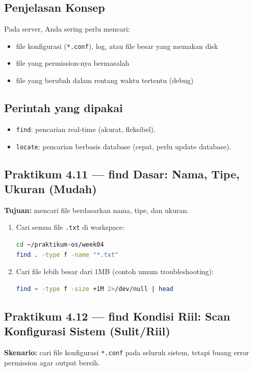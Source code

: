 \subsection*{Penjelasan Konsep}
Pada server, Anda sering perlu mencari:
\begin{itemize}
    \item file konfigurasi (\texttt{*.conf}), log, atau file besar yang memakan disk
    \item file yang permission-nya bermasalah
    \item file yang berubah dalam rentang waktu tertentu (debug)
\end{itemize}

\subsection*{Perintah yang dipakai}
\begin{itemize}
    \item \texttt{find}: pencarian real-time (akurat, fleksibel).
    \item \texttt{locate}: pencarian berbasis database (cepat, perlu update database).
\end{itemize}

\subsection*{Praktikum 4.11 --- find Dasar: Nama, Tipe, Ukuran (Mudah)}
\textbf{Tujuan:} mencari file berdasarkan nama, tipe, dan ukuran.

\begin{enumerate}
    \item Cari semua file \texttt{.txt} di workspace:
\begin{lstlisting}[language=bash, caption={find berdasarkan nama dan tipe}]
cd ~/praktikum-os/week04
find . -type f -name "*.txt"
\end{lstlisting}

    \item Cari file lebih besar dari 1MB (contoh umum troubleshooting):
\begin{lstlisting}[language=bash, caption={find berdasarkan ukuran file}]
find ~ -type f -size +1M 2>/dev/null | head
\end{lstlisting}
\end{enumerate}

\subsection*{Praktikum 4.12 --- find Kondisi Riil: Scan Konfigurasi Sistem (Sulit/Riil)}
\textbf{Skenario:} cari file konfigurasi \texttt{*.conf} pada seluruh sistem,
tetapi buang error permission agar output bersih.

